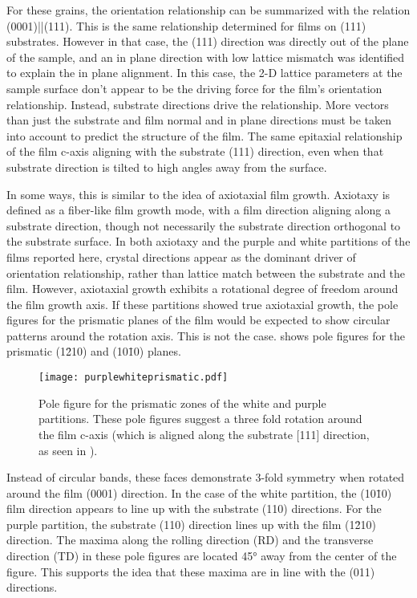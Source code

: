 For these grains, the orientation relationship can be summarized with the relation (0001)||(111).  This is the same relationship determined for films on (111) substrates. However in that case, the (111) direction was directly out of the plane of the sample, and an in plane direction with low lattice mismatch was identified to explain the in plane alignment. In this case, the 2-D lattice parameters at the sample surface don't appear to be the driving force for the film's orientation relationship. Instead, substrate directions drive the relationship. More vectors than just the substrate and film normal and in plane directions must be taken into account to predict the structure of the film. The same epitaxial relationship of the film c-axis aligning with the substrate (111) direction, even when that substrate direction is tilted to high angles away from the surface.

In some ways, this is similar to the idea of axiotaxial film growth. Axiotaxy is defined as a fiber-like film growth mode, with a film direction aligning along a substrate direction, though not necessarily the substrate direction orthogonal to the substrate surface. In both axiotaxy and the purple and white partitions of the films reported here, crystal directions appear as the dominant driver of orientation relationship, rather than lattice match between the substrate and the film. However, axiotaxial growth exhibits a rotational degree of freedom around the film growth axis.  If these partitions showed true axiotaxial growth, the pole figures for the prismatic planes of the film would be expected to show circular patterns around the rotation axis. This is not the case.  shows pole figures for the prismatic (1\={2}10) and (10\={1}0) planes.
\begin{figure}
	\texttt{[image: purplewhiteprismatic.pdf]}
	\caption[Prismatic pole figures for white and purple grains]{%
		Pole figure for the prismatic zones of the white and purple partitions. 
		These pole figures suggest a three fold rotation around the film c-axis 
		(which is aligned along the substrate [111] direction, as seen in 
		).}
	\label{fig:purplewhiteprismatic}
\end{figure}
Instead of circular bands, these faces demonstrate 3-fold symmetry when rotated around the film (0001) direction. In the case of the white partition, the (10\={1}0) film direction appears to line up with the substrate (110) directions. For the purple partition, the substrate (110) direction lines up with the film (1\={2}10) direction. The maxima along the rolling direction (RD) and the transverse direction (TD) in these pole figures are located 45\si{\degree} away from the center of the figure. This supports the idea that these maxima are in line with the (011) directions. 

